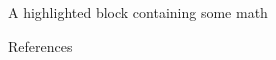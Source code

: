 \documentclass[final]{beamer}
\newlength{\sepwidth}
\newlength{\colwidth}
\newcommand{\separatorcolumn}{\begin{column}{\sepwidth}\end{column}}
\begin{document}
\begin{frame}[t]
\begin{columns}[t]
\begin{column}{\colwidth}
\begin{exampleblock}{A highlighted block containing some math}
  \end{exampleblock}

 

  \begin{block}{References}

    \nocite{*}
    \footnotesize{}

  \end{block}

\end{column}
\separatorcolumn



\end{columns}
\end{frame}
\end{document}
